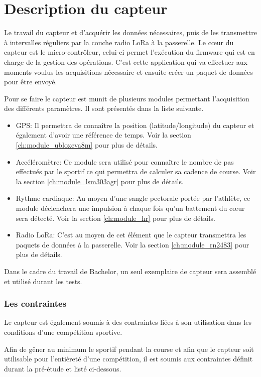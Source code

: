 \chapter{Description du capteur}\label{ch:capteur}

Le travail du capteur et d'acquérir les données nécessaires, puis de les transmettre à intervalles réguliers par la couche radio LoRa à la passerelle. Le cœur du capteur est le micro-contrôleur, celui-ci permet l'exécution du firmware qui est en charge de la gestion des opérations. C'est cette application qui va effectuer aux moments voulus les acquisitions nécessaire et ensuite créer un paquet de données pour être  envoyé.

Pour se faire le capteur est munit de plusieurs modules permettant l'acquisition des différents paramètres. Il sont présentés dans la liste suivante.

\begin{itemize}
\item GPS: Il permettra de connaître la position (latitude/longitude) du capteur et également d'avoir une référence de temps. Voir la section \ref{ch:module_ubloxeva8m} pour plus de détails.
\item Accéléromètre: Ce module sera utilisé pour connaître le nombre de pas effectués par le sportif ce qui permettra de calculer sa cadence de course. Voir la section \ref{ch:module_lsm303agr} pour plus de détails.
\item Rythme cardiaque:  Au moyen d'une sangle pectorale portée par l'athlète, ce module déclenchera une impulsion à chaque fois qu'un battement du cœur sera détecté. Voir la section \ref{ch:module_hr} pour plus de détails.
\item Radio LoRa: C'est au moyen de cet élément que le capteur transmettra les paquets de données à la passerelle. Voir la section \ref{ch:module_rn2483} pour plus de détails.
\end{itemize}

Dans le cadre du travail de Bachelor, un seul exemplaire de capteur sera assemblé et utilisé durant les tests.

\subsection{Les contraintes}

Le capteur est également soumis à des contraintes liées à son utilisation dans les conditions d'une compétition sportive.

Afin de gêner au minimum le sportif pendant la course et afin que le capteur soit utilisable pour l'entièreté d'une compétition, il est soumis aux contraintes définit durant la pré-étude et listé ci-dessous.

